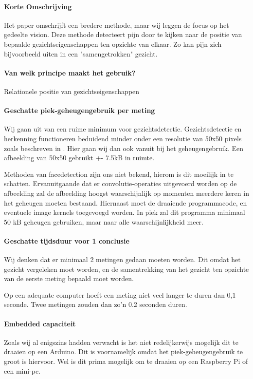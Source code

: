 \documentclass[11pt]{article}
\begin{document}
    \paragraph{Korte Omschrijving}
    Het paper omschrijft een bredere methode, maar wij leggen de focus op het gedeelte vision.
    Deze methode detecteert pijn door te kijken naar de positie van bepaalde gezichtseigenschappen ten opzichte van elkaar.
    Zo kan pijn zich bijvoorbeeld uiten in een "samengetrokken" gezicht.

    \paragraph{Van welk principe maakt het gebruik?}
    Relationele positie van gezichtseigenschappen

    \paragraph{Geschatte piek-geheugengebruik per meting}
    Wij gaan uit van een ruime minimum voor gezichtsdetectie.
    Gezichtsdetectie en herkenning functioneren beduidend minder onder een resolutie van 50x50 pixels zoals beschreven in \citet{boom2006effect}.
    Hier gaan wij dan ook vanuit bij het geheugengebruik.
    Een afbeelding van 50x50 gebruikt +- 7.5kB in ruimte.

    Methoden van facedetection zijn ons niet bekend, hierom is dit moeilijk in te schatten.
    Ervanuitgaande dat er convolutie-operaties uitgevoerd worden op de afbeelding zal de afbeelding hoogst waarschijnlijk op momenten meerdere keren in het geheugen moeten bestaand.
    Hiernaast moet de draaiende programmacode, en eventuele image kernels toegevoegd worden.
    In piek zal dit programma minimaal 50 kB geheugen gebruiken, maar naar alle waarschijnlijkheid meer.

    \paragraph{Geschatte tijdsduur voor 1 conclusie}
    Wij denken dat er minimaal 2 metingen gedaan moeten worden.
    Dit omdat het gezicht vergeleken moet worden, en de samentrekking van het gezicht ten opzichte van de eerste meting bepaald moet worden.

    Op een adequate computer hoeft een meting niet veel langer te duren dan 0,1 seconde.
    Twee metingen zouden dan zo'n 0.2 seconden duren.

    \paragraph{Embedded capaciteit}
    Zoals wij al enigszins hadden verwacht is het niet redelijkerwijs mogelijk dit te draaien op een Arduino.
    Dit is voornamelijk omdat het piek-geheugengebruik te groot is hiervoor.
    Wel is dit prima mogelijk om te draaien op een Raspberry Pi of een mini-pc.
\end{document}

